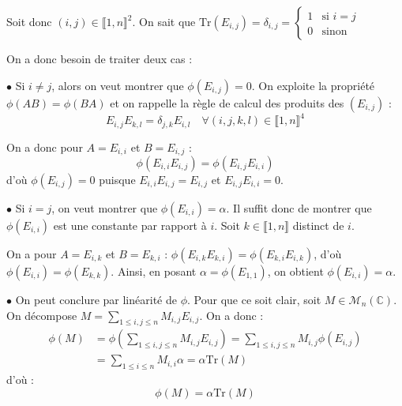\documentclass[11pt,a4paper]{report}
\begin{document}
\noindent Soit donc $(i,j) \in \llbracket 1,n \rrbracket^2$. On sait que $\mathrm{Tr}(E_{i,j}) = \delta_{i,j} = \left\{\begin{array}{ll} 1 & \text{si } i=j \\ 0 & \text{sinon} \end{array}\right.$

\noindent On a donc besoin de traiter deux cas :

\noindent $\bullet$ Si $i \neq j$, alors on veut montrer que $\phi(E_{i,j}) = 0$. On exploite la propriété $\phi(AB) = \phi(BA)$ et on rappelle la règle de calcul des produits des $(E_{i,j})$ :
$$ \boxed{E_{i,j} E_{k,l} = \delta_{j,k} E_{i,l} \quad \forall (i,j,k,l) \in \llbracket 1,n \rrbracket^4} $$

\noindent On a donc pour $A = E_{i,i}$ et $B = E_{i,j}$ :
$$ \phi(E_{i,i} E_{i,j}) = \phi(E_{i,j} E_{i,i}) $$
\noindent d'où $\phi(E_{i,j}) = 0$ puisque $E_{i,i} E_{i,j} = E_{i,j}$ et $E_{i,j} E_{i,i} = 0$.

\noindent $\bullet$ Si $i = j$, on veut montrer que $\phi(E_{i,i}) = \alpha$. Il suffit donc de montrer que $\phi(E_{i,i})$ est une constante par rapport à $i$. Soit $k \in \llbracket 1,n \rrbracket$ distinct de $i$.

\noindent On a pour $A = E_{i,k}$ et $B = E_{k,i}$ : $\phi(E_{i,k} E_{k,i}) = \phi(E_{k,i} E_{i,k})$, d'où $\phi(E_{i,i}) = \phi(E_{k,k})$. Ainsi, en posant $\alpha = \phi(E_{1,1})$, on obtient $\phi(E_{i,i}) = \alpha$.

\noindent $\bullet$ On peut conclure par linéarité de $\phi$. Pour que ce soit clair, soit $M \in \mathcal{M}_n(\mathbb{C})$. On décompose $M = \sum_{1 \leqslant i,j \leqslant n} M_{i,j} E_{i,j}$. On a donc :
\begin{align*}
\phi(M) &= \phi\left( \sum_{1 \leqslant i,j \leqslant n} M_{i,j} E_{i,j} \right) = \sum_{1 \leqslant i,j \leqslant n} M_{i,j} \phi(E_{i,j}) \\
&= \sum_{1 \leqslant i \leqslant n} M_{i,i} \alpha = \alpha \mathrm{Tr}(M)
\end{align*}
\noindent d'où :
$$ \boxed{\phi(M) = \alpha \mathrm{Tr}(M)} $$
\end{document}
